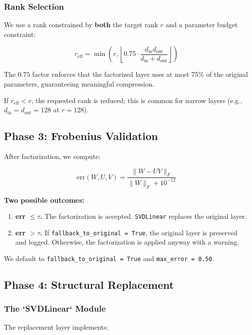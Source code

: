 \subsubsection{Rank Selection}

We use a rank constrained by \textbf{both} the target rank $r$ and a parameter 
budget constraint:

\[
r_\text{eff} = \min\!\left(r, \left\lfloor 0.75 \cdot \frac{d_\text{in} d_\text{out}}{d_\text{in} + d_\text{out}} \right\rfloor \right)
\tag{4.14}
\]

The $0.75$ factor enforces that the factorized layer uses at most 75\% of the 
original parameters, guaranteeing meaningful compression.

If $r_\text{eff} < r$, the requested rank is reduced; this is common for 
narrow layers (e.g., $d_\text{in} = d_\text{out} = 128$ at $r = 128$).

\subsection{Phase 3: Frobenius Validation}

After factorization, we compute:

\[
\text{err}(W, U, V) = \frac{\|W - UV\|_F}{\|W\|_F + 10^{-12}}
\tag{4.15}
\]

\textbf{Two possible outcomes:}

\begin{enumerate}
\item \textbf{err $\leq \tau$.} The factorization is accepted. \texttt{SVDLinear} replaces
  the original layer.
\item \textbf{err $> \tau$.} If \texttt{fallback\_to\_original = True}, the original layer
  is preserved and logged. Otherwise, the factorization is applied anyway
  with a warning.

\end{enumerate}
We default to \texttt{fallback\_to\_original = True} and \texttt{max\_error = 0.50}.

\subsection{Phase 4: Structural Replacement}

\subsubsection{The `SVDLinear` Module}

The replacement layer implements:

